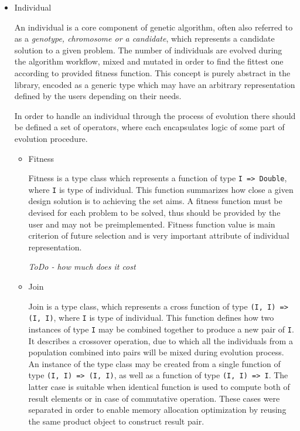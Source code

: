 \begin{itemize}

\item
Individual

An individual is a core component of genetic algorithm, often also referred to as a \textit{genotype, chromosome \emph{or} a candidate}, which represents a candidate solution to a given problem. The number of individuals are evolved during the algorithm workflow, mixed and mutated in order to find the fittest one according to provided fitness function. This concept is purely abstract in the library, encoded as a generic type which may have an arbitrary representation defined by the users depending on their needs. 

In order to handle an individual through the process of evolution there should be defined a set of operators, where each encapsulates logic of some part of evolution procedure.   
\medbreak

\begin{itemize}
\item
Fitness

Fitness is a type class which represents a function of type \texttt{I => Double}, where \texttt{I} is type of individual. This function summarizes how close a given design solution is to achieving the set aims. A fitness function must be devised for each problem to be solved, thus should be provided by the user and may not be preimplemented. Fitness function value is main criterion of future selection and is very important attribute of individual representation.

\textit{ToDo - how much does it cost}
\medbreak

\item
Join

Join is a type class, which represents a cross function of type \texttt{(I, I) => (I, I)}, where \texttt{I} is type of individual. This function defines how two instances of type \texttt{I} may be combined together to produce a new pair of \texttt{I}. It describes a crossover operation, due to which all the individuals from a population combined into pairs will be mixed during evolution process. An instance of the type class may be created from a single function of type \texttt{(I, I) => (I, I)}, as well as a function of type \texttt{(I, I) => I}. The latter case is suitable when identical function is used to compute both of result elements or in case of commutative operation. These cases were separated in order to enable memory allocation optimization by reusing the same product object to construct result pair.
\medbreak


\end{itemize}
\end{itemize}
